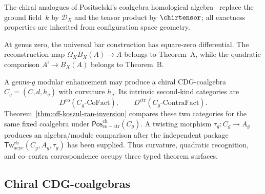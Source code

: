 The chiral analogues of Positselski's coalgebra homological
algebra~\cite{Positselski11} replace the ground field~$k$ by
$\mathcal{D}_X$ and the tensor product by $\chirtensor$; all
exactness properties are inherited from configuration space geometry.

\begin{remark}
\label{rem:coderived-scope}
At genus zero, the universal bar construction has square-zero
differential.  The reconstruction map
\(\Omega_XB_X(A)\to A\) belongs to Theorem~A, while the quadratic
comparison \(A^{\mathrm i}\to B_X(A)\) belongs to Theorem~B.

A genus-\(g\) modular enhancement may produce a chiral
CDG-coalgebra \(C_g=(C,d,h_g)\) with curvature \(h_g\).
Its intrinsic second-kind categories are
\[
D^{\mathrm{co}}(C_g\text{-}\mathrm{CoFact}),
\qquad
D^{\mathrm{ctr}}(C_g\text{-}\mathrm{ContraFact}).
\]
Theorem~\ref{thm:off-koszul-ran-inversion} compares these two
categories for the same fixed coalgebra under
\(\mathsf{Pos}^{\mathrm{ch}}_{\mathrm{co-ctr}}(C_g)\).
A twisting morphism \(\tau_g\colon C_g\to A_g\) produces an
algebra/module comparison after the independent package
\(\mathsf{Tw}^{\mathrm{ch}}_{\mathrm{acyc}}(C_g,A_g,\tau_g)\)
has been supplied.  Thus curvature, quadratic recognition, and
co--contra correspondence occupy three typed theorem surfaces.
\end{remark}

\subsection{Chiral CDG-coalgebras}
\label{subsec:chiral-CDG-coalgebra}

